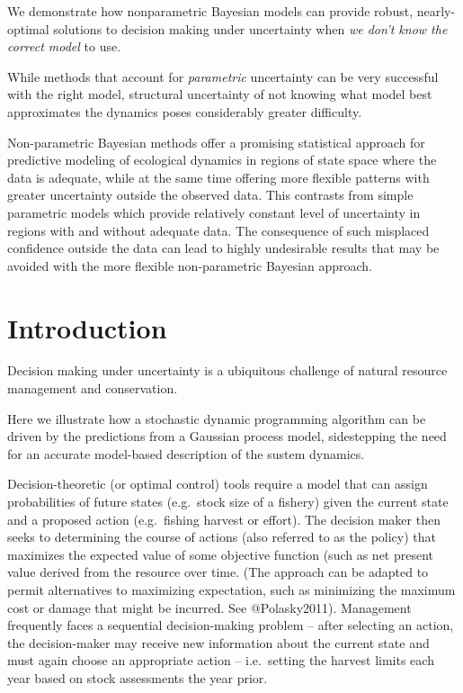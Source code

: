 \documentclass[author-year, review]{elsarticle} %
\begin{document}
We demonstrate how nonparametric Bayesian models can provide robust,
nearly-optimal solutions to decision making under uncertainty when
\emph{we don't know the correct model} to use.

While methods that account for \emph{parametric} uncertainty can be very
successful with the right model, structural uncertainty of not knowing
what model best approximates the dynamics poses considerably greater
difficulty.

Non-parametric Bayesian methods offer a promising statistical approach
for predictive modeling of ecological dynamics in regions of state space
where the data is adequate, while at the same time offering more
flexible patterns with greater uncertainty outside the observed data.
This contrasts from simple parametric models which provide relatively
constant level of uncertainty in regions with and without adequate data.
The consequence of such misplaced confidence outside the data can lead
to highly undesirable results that may be avoided with the more flexible
non-parametric Bayesian approach.

\section{Introduction}

Decision making under uncertainty is a ubiquitous challenge of natural
resource management and conservation.

Here we illustrate how a stochastic dynamic programming algorithm can be
driven by the predictions from a Gaussian process model, sidestepping
the need for an accurate model-based description of the sustem dynamics.

Decision-theoretic (or optimal control) tools require a model that can
assign probabilities of future states (e.g.~stock size of a fishery)
given the current state and a proposed action (e.g.~fishing harvest or
effort). The decision maker then seeks to determining the course of
actions (also referred to as the policy) that maximizes the expected
value of some objective function (such as net present value derived from
the resource over time. (The approach can be adapted to permit
alternatives to maximizing expectation, such as minimizing the maximum
cost or damage that might be incurred. See @Polasky2011). Management
frequently faces a sequential decision-making problem -- after selecting
an action, the decision-maker may receive new information about the
current state and must again choose an appropriate action --
i.e.~setting the harvest limits each year based on stock assessments the
year prior.
\end{document}
